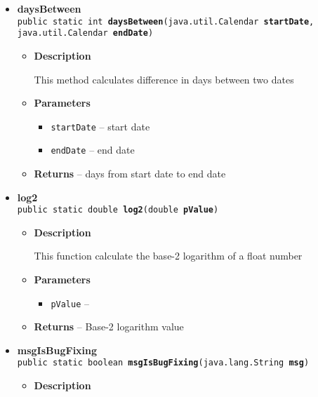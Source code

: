 {{{{{{{{{\begin{itemize}
{\begin{itemize}
{This method convert an instance of Date into an instance of Calendar
}
\item{
{\bf  Parameters}
  \begin{itemize}
   \item{
\texttt{pDate} -- }
  \end{itemize}
}%
\item{{\bf  Returns} -- 
A Calendar object 
}%
\end{itemize}
}%
\item{ 
\hypertarget{it.unisa.sesa.repominer.util.Utils.daysBetween(java.util.Calendar, java.util.Calendar)}{{\bf  daysBetween}\\}
\texttt{public static int\ {\bf  daysBetween}(\texttt{java.util.Calendar} {\bf  startDate},
\texttt{java.util.Calendar} {\bf  endDate})
\label{it.unisa.sesa.repominer.util.Utils.daysBetween(java.util.Calendar, java.util.Calendar)}}%
\begin{itemize}
\item{
{\bf  Description}

This method calculates difference in days between two dates
}
\item{
{\bf  Parameters}
  \begin{itemize}
   \item{
\texttt{startDate} -- start date}
   \item{
\texttt{endDate} -- end date}
  \end{itemize}
}%
\item{{\bf  Returns} -- 
days from start date to end date 
}%
\end{itemize}
}%
\item{ 
\hypertarget{it.unisa.sesa.repominer.util.Utils.log2(double)}{{\bf  log2}\\}
\texttt{public static double\ {\bf  log2}(\texttt{double} {\bf  pValue})
\label{it.unisa.sesa.repominer.util.Utils.log2(double)}}%
\begin{itemize}
\item{
{\bf  Description}

This function calculate the base-2 logarithm of a float number
}
\item{
{\bf  Parameters}
  \begin{itemize}
   \item{
\texttt{pValue} -- }
  \end{itemize}
}%
\item{{\bf  Returns} -- 
Base-2 logarithm value 
}%
\end{itemize}
}%
\item{ 
\hypertarget{it.unisa.sesa.repominer.util.Utils.msgIsBugFixing(java.lang.String)}{{\bf  msgIsBugFixing}\\}
\texttt{public static boolean\ {\bf  msgIsBugFixing}(\texttt{java.lang.String} {\bf  msg})
\label{it.unisa.sesa.repominer.util.Utils.msgIsBugFixing(java.lang.String)}}%
\begin{itemize}
\item{
{\bf  Description}

}
\end{itemize}}
\end{itemize}}}}}}}}}}

